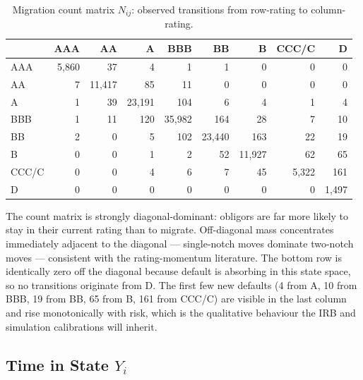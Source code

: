 \documentclass[
  11pt,
]{article}
\begin{document}
\begin{longtable}[t]{lrrrrrrrr}
\caption{\label{tab:task1-N-table}Migration count matrix $N_{ij}$: observed transitions from row-rating to column-rating.}\\
\toprule
 & AAA & AA & A & BBB & BB & B & CCC/C & D\\
\midrule
AAA & 5,860 & 37 & 4 & 1 & 1 & 0 & 0 & 0\\
AA & 7 & 11,417 & 85 & 11 & 0 & 0 & 0 & 0\\
A & 1 & 39 & 23,191 & 104 & 6 & 4 & 1 & 4\\
BBB & 1 & 11 & 120 & 35,982 & 164 & 28 & 7 & 10\\
BB & 2 & 0 & 5 & 102 & 23,440 & 163 & 22 & 19\\
\addlinespace
B & 0 & 0 & 1 & 2 & 52 & 11,927 & 62 & 65\\
CCC/C & 0 & 0 & 4 & 6 & 7 & 45 & 5,322 & 161\\
D & 0 & 0 & 0 & 0 & 0 & 0 & 0 & 1,497\\
\bottomrule
\end{longtable}

The count matrix is strongly diagonal-dominant: obligors are far more
likely to stay in their current rating than to migrate. Off-diagonal
mass concentrates immediately adjacent to the diagonal --- single-notch
moves dominate two-notch moves --- consistent with the rating-momentum
literature. The bottom row is identically zero off the diagonal because
default is absorbing in this state space, so no transitions originate
from \(\mathrm{D}\). The first few new defaults (4 from A, 10 from BBB,
19 from BB, 65 from B, 161 from CCC/C) are visible in the last column
and rise monotonically with risk, which is the qualitative behaviour the
IRB and simulation calibrations will inherit.

\subsection{\texorpdfstring{Time in State
\(Y_i\)}{Time in State Y\_i}}\label{time-in-state-y_i}
\end{document}
